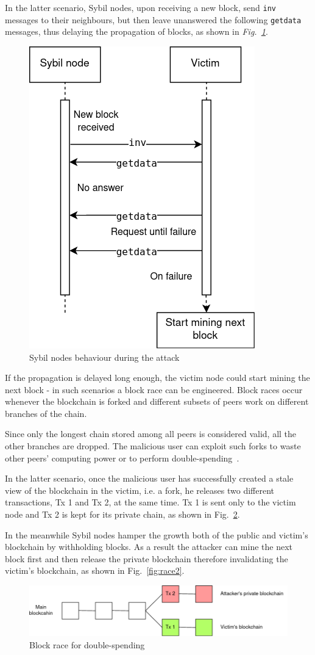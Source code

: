 \documentclass[12pt, letterpaper, twoside]{article}
\begin{document}
In the latter scenario, Sybil nodes, upon receiving a new block, send \texttt{inv} messages to their neighbours, but then leave unanswered the following \texttt{getdata} messages, thus delaying the propagation of blocks, as shown in \emph{Fig.~\ref{fig:sybil}}.

\begin{figure}[h!]
	\includegraphics[width=.4\textwidth]{pict/sybil.png}
	\centering
	\caption{Sybil nodes behaviour during the attack}
	\label{fig:sybil}
\end{figure}

If the propagation is delayed long enough, the victim node could start mining the next block - in such scenarios a block race can be engineered. Block races occur whenever the blockchain is forked and different subsets of peers work on different branches of the chain.

Since only the longest chain stored among all peers is considered valid, all the other branches are dropped. The malicious user can exploit such forks to waste other peers' computing power or to perform double-spending~\cite{zhang-ds-sybil}. 

In the latter scenario, once the malicious user has successfully created a stale view of the blockchain in the victim, i.e. a fork, he releases two different transactions, Tx 1 and Tx 2, at the same time. Tx 1 is sent only to the victim node and Tx 2 is kept for its private chain, as shown in Fig.~\ref{fig:race1}.

In the meanwhile Sybil nodes hamper the growth both of the public and victim's blockchain by withholding blocks. As a result the attacker can mine the next block first and then release the private blockchain therefore invalidating the victim's blockchain, as shown in Fig.~\ref{fig:race2}.

\begin{figure}[h!]
	\includegraphics[width=.9\textwidth]{pict/blockrace1.png}
	\centering
	\caption{Block race for double-spending}
	\label{fig:race1}
\end{figure}
\end{document}

